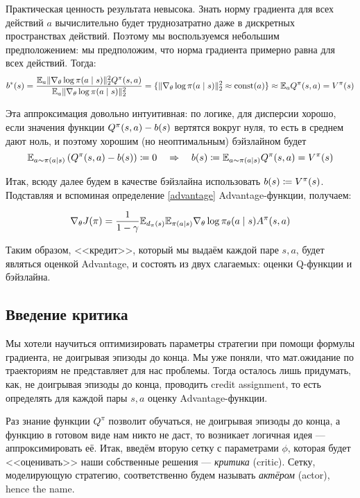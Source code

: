 Практическая ценность результата невысока. Знать норму градиента для всех действий $a$ вычислительно будет труднозатратно даже в дискретных пространствах действий. Поэтому мы воспользуемся небольшим предположением: мы предположим, что норма градиента примерно равна для всех действий. Тогда:
$$b^*(s) = \frac{\mathbb{E}_a \|\nabla_{\theta} \log \pi(a \mid s)\|_2^2 Q^{\pi}(s, a)}{\mathbb{E}_a \|\nabla_{\theta} \log \pi(a \mid s)\|_2^2} = \{ \|\nabla_{\theta} \log \pi(a \mid s)\|_2^2 \approx \operatorname{const}(a) \} \approx \mathbb{E}_a Q^{\pi}(s, a) = V^\pi(s)$$

Эта аппроксимация довольно интуитивная: по логике, для дисперсии хорошо, если значения функции $Q^\pi(s, a) \HM- b(s)$ вертятся вокруг нуля, то есть в среднем дают ноль, и поэтому хорошим (но неоптимальным) бэйзлайном будет
$$\mathbb{E}_{a \sim \pi(a \mid s)} \left( Q^{\pi}(s, a) - b(s) \right) \coloneqq 0 \quad \Rightarrow \quad b(s) \coloneqq \mathbb{E}_{a \sim \pi(a \mid s)} Q^{\pi}(s, a) = V^\pi(s)$$

Итак, всюду далее будем в качестве бэйзлайна использовать $b(s) \HM \coloneqq V^\pi(s)$. Подставляя и вспоминая определение \eqref{advantage} Advantage-функции, получаем:
\begin{proposition}
\begin{equation}\label{advantagepg}
\nabla_{\theta} J(\pi) = \frac{1}{1 - \gamma}\mathbb{E}_{d_\pi(s)} \mathbb{E}_{\pi(a \mid s)} \nabla_{\theta} \log \pi_\theta (a \mid s) A^{\pi}(s, a)
\end{equation}
\end{proposition}

Таким образом, <<кредит>>, который мы выдаём каждой паре $s, a$, будет являться оценкой Advantage, и состоять из двух слагаемых: оценки Q-функции и бэйзлайна.

\subsection{Введение критика}

Мы хотели научиться оптимизировать параметры стратегии при помощи формулы градиента, не доигрывая эпизоды до конца. Мы уже поняли, что мат.ожидание по траекториям не представляет для нас проблемы. Тогда осталось лишь придумать, как, не доигрывая эпизоды до конца, проводить credit assignment, то есть определять для каждой пары $s, a$ оценку Advantage-функции.

Раз знание функции $Q^\pi$ позволит обучаться, не доигрывая эпизоды до конца, а функцию в готовом виде нам никто не даст, то возникает логичная идея --- аппроксимировать её. Итак, введём вторую сетку с параметрами $\phi$, которая будет <<оценивать>> наши собственные решения --- \emph{критика} (critic). Сетку, моделирующую стратегию, соответственно будем называть \emph{актёром} (actor), hence the name.

